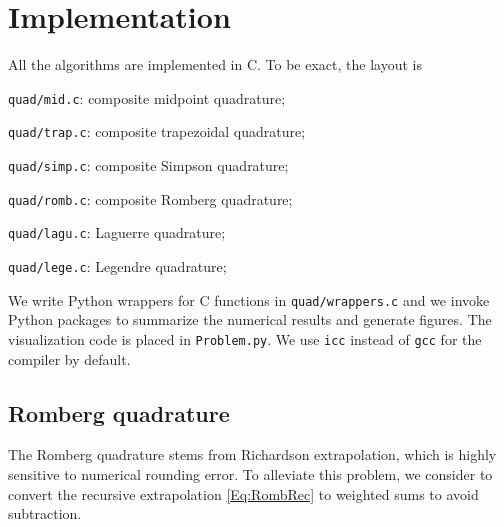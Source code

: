 \documentclass[english, nochinese]{pnote}
\begin{document}
\section{Implementation}

All the algorithms are implemented in C. To be exact, the layout is
\begin{partlist}
\item \verb"quad/mid.c": composite midpoint quadrature;
\item \verb"quad/trap.c": composite trapezoidal quadrature;
\item \verb"quad/simp.c": composite Simpson quadrature;
\item \verb"quad/romb.c": composite Romberg quadrature;
\item \verb"quad/lagu.c": Laguerre quadrature;
\item \verb"quad/lege.c": Legendre quadrature;
\end{partlist}
We write Python wrappers for C functions in \verb"quad/wrappers.c" and we invoke Python packages to summarize the numerical results and generate figures. The visualization code is placed in \verb"Problem.py". We use \verb"icc" instead of \verb"gcc" for the compiler by default.

\subsection{Romberg quadrature}

The Romberg quadrature stems from Richardson extrapolation, which is highly sensitive to numerical rounding error. To alleviate this problem, we consider to convert the recursive extrapolation \eqref{Eq:RombRec} to weighted sums to avoid subtraction.
\end{document}
